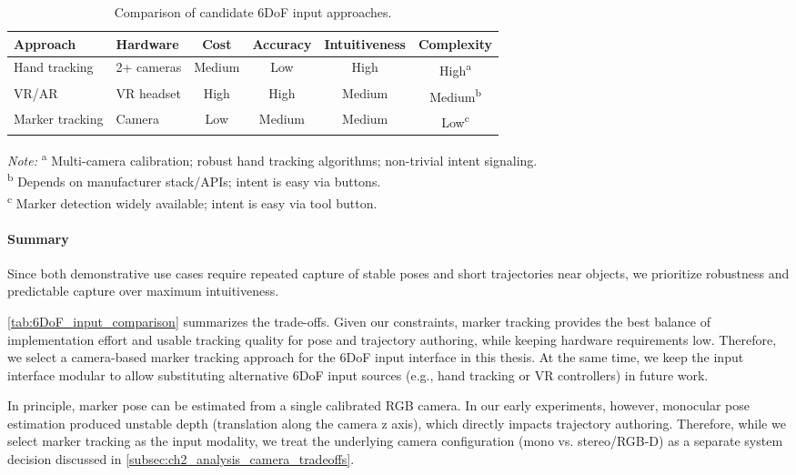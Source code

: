 \begin{table}[t]
\centering
\caption{Comparison of candidate 6DoF input approaches.}
\label{tab:6DoF_input_comparison}

\small 

\begin{tabular}{l l c c c c}
\toprule
Approach & Hardware & Cost & Accuracy & Intuitiveness & Complexity \\
\midrule
Hand tracking &
2+ cameras &
Medium &
Low &
High &
High\textsuperscript{a} \\

VR/AR &
VR headset &
High &
High &
Medium &
Medium\textsuperscript{b} \\

Marker tracking &
Camera &
Low &
Medium &
Medium &
Low\textsuperscript{c} \\
\bottomrule
\end{tabular}

\vspace{0.4em}
\footnotesize
\emph{Note:}
\textsuperscript{a} Multi-camera calibration; robust hand tracking algorithms; non-trivial intent signaling. \\
\textsuperscript{b} Depends on manufacturer stack/APIs; intent is easy via buttons. \\
\textsuperscript{c} Marker detection widely available; intent is easy via tool button.
\end{table}

\paragraph{Summary}
Since both demonstrative use cases require repeated capture of stable poses and short trajectories near objects, we prioritize robustness and predictable capture over maximum intuitiveness.

\autoref{tab:6DoF_input_comparison} summarizes the trade-offs. Given our constraints, marker tracking provides the best balance of implementation effort and usable tracking quality for pose and trajectory authoring, while keeping hardware requirements low. Therefore, we select a camera-based marker tracking approach for the 6DoF input interface in this thesis. At the same time, we keep the input interface modular to allow substituting alternative 6DoF input sources (e.g., hand tracking or VR controllers) in future work.

In principle, marker pose can be estimated from a single calibrated RGB camera. In our early experiments, however, monocular pose estimation produced unstable depth (translation along the camera z axis), which directly impacts trajectory authoring. Therefore, while we select marker tracking as the input modality, we treat the underlying camera configuration (mono vs. stereo/RGB-D) as a separate system decision discussed in \autoref{subsec:ch2_analysis_camera_tradeoffs}.

